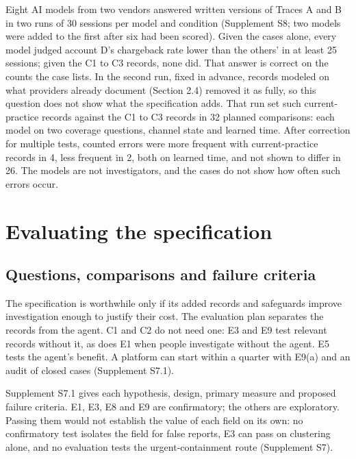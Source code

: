 \documentclass[acmlarge,review,anonymous,nonacm]{acmart}
\begin{document}
Eight AI models from two vendors answered written versions of Traces A
and B in two runs of 30 sessions per model and condition (Supplement S8;
two models were added to the first after six had been scored). Given the
cases alone, every model judged account D's chargeback rate lower than
the others' in at least 25 sessions; given the C1 to C3 records, none
did. That answer is correct on the counts the case lists. In the second
run, fixed in advance, records modeled on what providers already
document (Section 2.4) removed it as fully, so this question does not
show what the specification adds. That run set such current-practice
records against the C1 to C3 records in 32 planned comparisons: each
model on two coverage questions, channel state and learned time. After
correction for multiple tests, counted errors were more frequent with
current-practice records in 4, less frequent in 2, both on learned time,
and not shown to differ in 26. The models are not investigators, and the
cases do not show how often such errors occur.

\hypertarget{evaluating-the-specification}{%
\section{Evaluating the
specification}\label{evaluating-the-specification}}

\hypertarget{questions-comparisons-and-failure-criteria}{%
\subsection{Questions, comparisons and failure
criteria}\label{questions-comparisons-and-failure-criteria}}

The specification is worthwhile only if its added records and safeguards
improve investigation enough to justify their cost. The evaluation plan
separates the records from the agent. C1 and C2 do not need one: E3 and
E9 test relevant records without it, as does E1 when people investigate
without the agent. E5 tests the agent's benefit. A platform can start
within a quarter with E9(a) and an audit of closed cases (Supplement
S7.1).

Supplement S7.1 gives each hypothesis, design, primary measure and
proposed failure criteria. E1, E3, E8 and E9 are confirmatory; the
others are exploratory. Passing them would not establish the value of
each field on its own: no confirmatory test isolates the field for false
reports, E3 can pass on clustering alone, and no evaluation tests the
urgent-containment route (Supplement S7).
\end{document}
